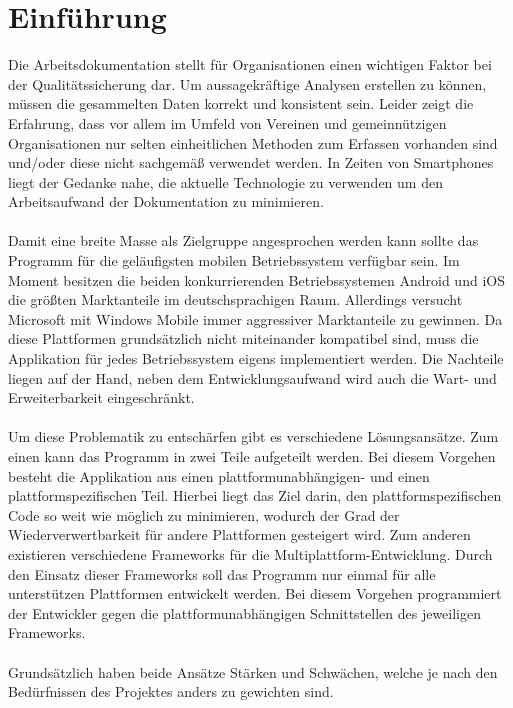 \documentclass[Bachelorarbeit.tex]{subfiles}
\begin{document}
\chapter{Einführung}
\label{chap:einfuehrung}

Die Arbeitsdokumentation stellt für Organisationen einen wichtigen Faktor bei der Qualitätssicherung dar. 
Um aussagekräftige Analysen erstellen zu können, müssen die gesammelten Daten korrekt und konsistent sein. 
Leider zeigt die Erfahrung,  dass vor allem im Umfeld von Vereinen und gemeinnützigen Organisationen nur selten einheitlichen Methoden zum Erfassen vorhanden sind und/oder diese nicht sachgemäß verwendet werden. 
In Zeiten von Smartphones liegt der Gedanke nahe, die aktuelle Technologie zu verwenden um den Arbeitsaufwand der Dokumentation zu minimieren. \\
\\
Damit eine breite Masse als Zielgruppe angesprochen werden kann sollte das Programm für die geläufigsten mobilen Betriebssystem verfügbar sein. 
Im Moment besitzen die beiden konkurrierenden Betriebssystemen Android und iOS die größten Marktanteile im deutschsprachigen Raum. 
Allerdings versucht Microsoft mit Windows Mobile immer aggressiver Marktanteile zu gewinnen. 
Da diese Plattformen grundsätzlich nicht miteinander kompatibel sind, muss die Applikation für jedes Betriebssystem eigens implementiert werden. 
Die Nachteile liegen auf der Hand, neben dem Entwicklungsaufwand wird auch die Wart- und Erweiterbarkeit eingeschränkt.  \\
\\
Um diese Problematik zu entschärfen gibt es verschiedene Lösungsansätze. 
Zum einen kann das Programm in zwei Teile aufgeteilt werden. 
Bei diesem Vorgehen besteht die Applikation aus einen plattformunabhängigen- und einen plattformspezifischen Teil. 
Hierbei liegt das Ziel darin, den plattformspezifischen Code so weit wie möglich zu minimieren, wodurch der Grad der Wiederverwertbarkeit für andere Plattformen gesteigert wird. 
Zum anderen existieren verschiedene Frameworks für die Multiplattform-Entwicklung. 
Durch den Einsatz dieser Frameworks soll das Programm nur einmal für alle unterstützen Plattformen entwickelt werden. Bei diesem Vorgehen programmiert der Entwickler gegen die plattformunabhängigen Schnittstellen des jeweiligen Frameworks.  \\
\\
Grundsätzlich haben beide Ansätze Stärken und Schwächen, welche je nach den Bedürfnissen des Projektes anders zu gewichten sind. 
\end{document}
